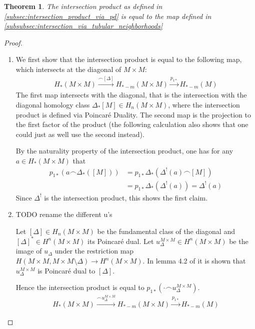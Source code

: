 \documentclass{scrartcl}
\theoremstyle{plain}
\newtheorem{theorem}{Theorem}[section]
\theoremstyle{definition}
\newcommand{\capp}{\mathbin{\frown}}
\begin{document}
\begin{theorem}\label{thm:intersection_product_tubular}
    The intersection product as defined in \ref{subsec:intersection_product_via_pd} is equal to the map defined in \ref{subsubsec:intersection_via_tubular_neighborhoods}
\end{theorem}
\begin{proof}
    \begin{enumerate}
        \item We first show that the intersection product is equal to the following map, which intersects at the diagonal of $M\times M$: 
        \begin{align*}
            H_*(M\times M) \xrightarrow{\capp [\Delta]} H_{*-m}(M\times M) \xrightarrow{p_{1*}} H_{*-m}(M)
        \end{align*}
        The first map intersects with the diagonal, that is the intersection with the diagonal homology class $\Delta_*[M]\in H_n(M\times M)$, where the intersection product is defined via Poincaré Duality. The second map is the projection to the first factor of the product (the following calculation also shows that one could just as well use the second instead).

        By the naturality property of the intersection product, one has for any $a\in H_*(M\times M)$ that
        \begin{align*}
            p_{1*}(a \capp \Delta_*([M])) &= p_{1*}\Delta_*(\Delta^!(a) \capp [M]) \\
            &= p_{1*}\Delta_*(\Delta^!(a)) = \Delta^!(a)
        \end{align*}
        Since $\Delta^!$ is the intersection product, this shows the first claim.

        \item 
        TODO rename the different u's

        Let $[\Delta]\in H_n(M\times M)$ be the fundamental class of the diagonal and $[\Delta]^*\in H^n(M\times M)$ its Poincaré dual. Let $u_\Delta^{M\times M}\in H^n(M\times M)$ be the image of $u_\Delta$ under the restriction map $H(M\times M, M\times M\setminus \Delta)\to H^n(M\times M)$. In lemma 4.2 of \cite{hutchings2011cup} it is shown that $u^{M\times M}_\Delta$ is Poincaré dual to $[\Delta]$.

        Hence the intersection product is equal to $p_{1*}(\cdot \capp u^{M\times M}_\Delta)$. 
        \begin{align*}
            H_*(M\times M) \xrightarrow{\capp u^{M\times M}_\Delta} H_{*-m}(M\times M) \xrightarrow{p_{1*}} H_{*-m}(M)
        \end{align*}
            


\end{enumerate}
\end{proof}
\end{document}
